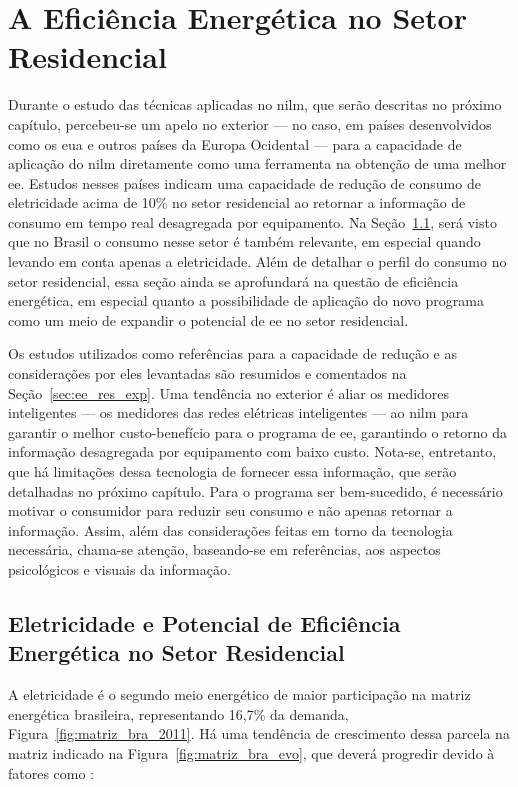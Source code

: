 \chapter{A Eficiência Energética no Setor Residencial}
\label{chap:ee_retorno}

Durante o estudo das técnicas aplicadas no \acs{nilm}, que serão
descritas no próximo capítulo, percebeu-se um apelo no exterior --- no
caso, em países desenvolvidos como os \acs{eua} e outros países da
Europa Ocidental --- para a capacidade de aplicação do \acs{nilm}
diretamente como uma ferramenta na obtenção de uma melhor \acs{ee}.
Estudos nesses países indicam uma capacidade de redução de consumo de eletricidade
acima de 10\% no setor residencial ao retornar a informação de
consumo em tempo real desagregada por equipamento. Na
Seção~\ref{sec:ee_setor_residencial}, será visto que no Brasil o
consumo nesse setor é também relevante, em especial quando levando em
conta apenas a eletricidade. Além de detalhar o perfil do consumo no
setor residencial, essa seção ainda se aprofundará na questão de
eficiência energética, em especial quanto a possibilidade de aplicação
do novo programa como um meio de expandir o potencial de \acs{ee} no
setor residencial.

Os estudos utilizados como referências para a capacidade de redução e
as considerações por eles levantadas são resumidos e comentados na
Seção~\ref{sec:ee_res_exp}. Uma tendência no exterior é aliar os
medidores inteligentes --- os medidores das redes elétricas
inteligentes --- ao \acs{nilm} para garantir o melhor
custo-benefício para o programa de \acs{ee}, garantindo o retorno da
informação desagregada por equipamento com baixo custo. Nota-se,
entretanto, que há limitações dessa tecnologia de fornecer essa
informação, que serão detalhadas no próximo capítulo. Para o programa
ser bem-sucedido, é necessário motivar o consumidor para reduzir seu
consumo e não apenas retornar a informação. Assim, além das
considerações feitas em torno da tecnologia necessária, chama-se
atenção, baseando-se em referências, aos aspectos psicológicos e
visuais da informação.

\section{Eletricidade e Potencial de Eficiência Energética 
no Setor Residencial}
\label{sec:ee_setor_residencial}

A eletricidade é o segundo meio energético de maior participação na matriz 
energética brasileira, representando 16,7\% da demanda, 
Figura~\ref{fig:matriz_bra_2011}. 
Há uma tendência de crescimento dessa parcela na matriz indicado na 
Figura~\ref{fig:matriz_bra_evo}, que deverá progredir devido à fatores 
como \cite{iea_weo2010}:

